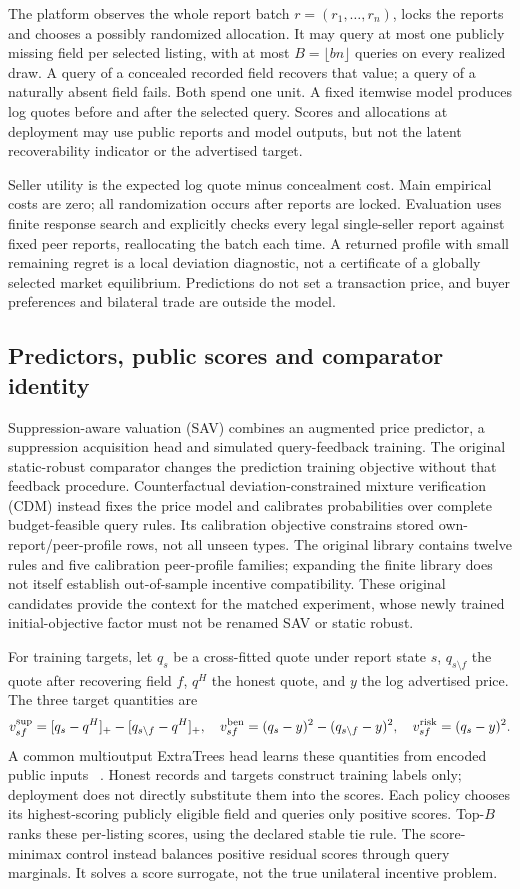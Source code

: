 \documentclass[11pt]{article}
\begin{document}
The platform observes the whole report batch $r=(r_1,\ldots,r_n)$, locks the
reports and chooses a possibly randomized allocation. It may query at most one
publicly missing field per selected listing, with at most $B=\lfloor bn\rfloor$
queries on every realized draw. A query of a concealed recorded field recovers
that value; a query of a naturally absent field fails. Both spend one unit.
A fixed itemwise model produces log quotes before and after the selected query.
Scores and allocations at deployment may use public reports and model outputs,
but not the latent recoverability indicator or the advertised target.

Seller utility is the expected log quote minus concealment cost. Main empirical
costs are zero; all randomization occurs after reports are locked. Evaluation
uses finite response search and explicitly checks every legal single-seller
report against fixed peer reports, reallocating the batch each time. A returned
profile with small remaining regret is a local deviation diagnostic, not a
certificate of a globally selected market equilibrium. Predictions do not set a
transaction price, and buyer preferences and bilateral trade are outside the model.

\subsection{Predictors, public scores and comparator identity}
Suppression-aware valuation (SAV) combines an augmented price predictor,
a suppression acquisition head and simulated query-feedback training. The
original static-robust comparator changes the prediction training objective
without that feedback procedure. Counterfactual deviation-constrained mixture
verification (CDM) instead fixes the price model and calibrates probabilities
over complete budget-feasible query rules. Its calibration objective constrains
stored own-report/peer-profile rows, not all unseen types. The original library
contains twelve rules and five calibration peer-profile families; expanding the
finite library does not itself establish out-of-sample incentive compatibility.
These original candidates provide the context for the matched experiment,
whose newly trained initial-objective factor must not be renamed SAV or static robust.

For training targets, let $q_s$ be a cross-fitted quote under report state $s$,
$q_{s\setminus f}$ the quote after recovering field $f$, $q^H$ the honest quote,
and $y$ the log advertised price. The three target quantities are
\[
 v_{sf}^{\rm sup}=[q_s-q^H]_+-[q_{s\setminus f}-q^H]_+,
 \quad v_{sf}^{\rm ben}=(q_s-y)^2-(q_{s\setminus f}-y)^2,
 \quad v_{sf}^{\rm risk}=(q_s-y)^2.
\]
A common multioutput ExtraTrees head learns these quantities from encoded
public inputs ~\cite{extratrees}. Honest records and targets construct training
labels only; deployment does not directly substitute them into the scores.
Each policy chooses its highest-scoring publicly eligible field and queries
only positive scores. Top-$B$ ranks these per-listing scores, using the declared
stable tie rule. The score-minimax control instead balances positive residual
scores through query marginals. It solves a score surrogate, not the true
unilateral incentive problem.
\end{document}
